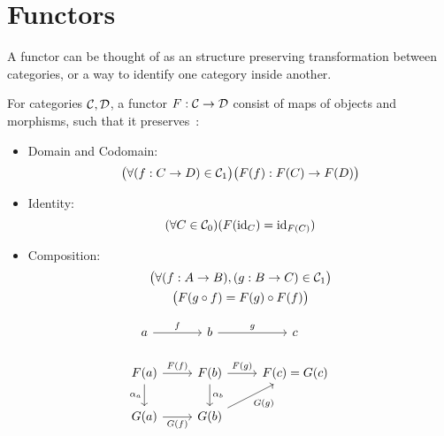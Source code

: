 \section{Functors}
A functor can be thought of as an structure preserving transformation between
categories, or a way to identify one category inside another.

\begin{definition}[Functor]
  For categories $\mathcal{C},\mathcal{D}$, a functor $F: \mathcal{C} \to \mathcal{D}$ consist of maps of objects
  and morphisms, such that it
  preserves~\parencite[p.~8]{awodey:category_theory}:
  \begin{itemize}
    \item Domain and Codomain:
      \[\big(\forall (f:C\to D)\in \mathcal{C}_1\big)
        \big(F(f): F(C) \to F(D)\big)\]
    \item Identity:
      \[(\forall C \in \mathcal{C}_0)
        (F(\mathrm{id}_C) = \mathrm{id}_{F(C)})\]
    \item Composition:
      \[
        \begin{gathered}
          \big(\forall (f: A \to B), (g: B\to C) \in \mathcal{C}_1\big)\\
          \big(F(g \circ f) = F(g) \circ F(f)\big)
        \end{gathered}
      \]
  \end{itemize}
\end{definition}

\begin{example}
  \[\begin{tikzcd}[ampersand replacement=\&]
    a \& b \& c \\
    {F(a)} \& {F(b)} \& {F(c)=G(c)} \\
    {G(a)} \& {G(b)}
    \arrow["{\alpha_a}"', from=2-1, to=3-1]
    \arrow["{\alpha_b}", from=2-2, to=3-2]
    \arrow["{F(f)}", from=2-1, to=2-2]
    \arrow["{G(f)}"', from=3-1, to=3-2]
    \arrow["f", from=1-1, to=1-2]
    \arrow["g", from=1-2, to=1-3]
    \arrow["{F(g)}", from=2-2, to=2-3]
    \arrow["{G(g)}"', from=3-2, to=2-3]
  \end{tikzcd}\]
\end{example}

